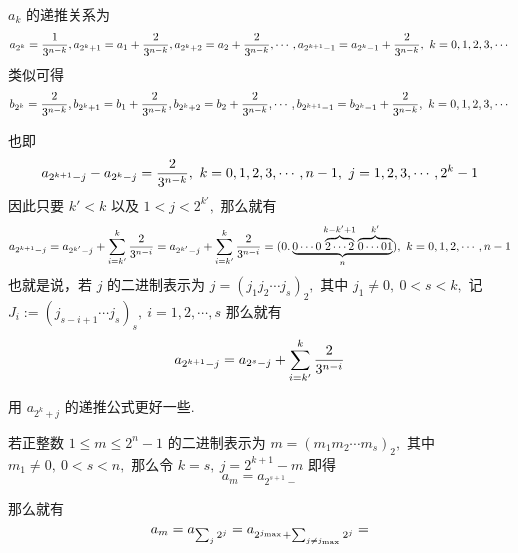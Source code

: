 \documentclass[12pt, a4paper, oneside]{book}
\numberwithin{figure}{section}
\theoremstyle{definition}
\begin{document}
$a_k$ 的递推关系为
\begin{equation}\label{a_k recurrence relation}
    a_{2^k}={1\over 3^{n-k}},a_{2^k+1}=a_1+{2\over 3^{n-k}}, a_{2^k+2}=a_{2}+{2\over 3^{n-k}},\cdots,a_{2^{k+1}-1}=a_{2^{k}-1}+{2\over 3^{n-k}},\ k=0,1,2,3,\cdots
\end{equation}
类似可得
\begin{equation}
    b_{2^k}={2\over 3^{n-k}},b_{2^k+1}=b_1+{2\over 3^{n-k}}, b_{2^k+2}=b_{2}+{2\over 3^{n-k}},\cdots,b_{2^{k+1}-1}=b_{2^{k}-1}+{2\over 3^{n-k}},\ k=0,1,2,3,\cdots
\end{equation}

也即
\begin{equation}
    a_{2^{k+1}-j}-a_{2^k-j}={2\over 3^{n-k}},\ k=0,1,2,3,\cdots,n-1,\ j=1,2,3,\cdots,2^{k}-1
\end{equation}
因此只要 $k'<k$ 以及 $1<j<2^{k'},$ 那么就有
\begin{equation}
    a_{2^{k+1}-j}=a_{2^{k'}-j}+\sum_{i=k'}^k {2\over 3^{n-i}}=a_{2^{k'}-j}+\sum_{i=k'}^k {2\over 3^{n-i}}=(0.\underbrace{{0\cdots 0\overbrace{2\cdots 2}^{k-k'+1}}\overbrace{0\cdots 01}^{k'} }_{n}),\ k=0,1,2,\cdots,n-1
\end{equation}
也就是说，若 $j$ 的二进制表示为 $j=(j_1j_2\cdots j_{s})_2,$ 其中 $j_1\neq 0,\ 0<s<k,$ 
记 $J_i:=(j_{s-i+1}\cdots j_s)_s,\ i=1,2,\cdots,s$ 那么就有
\begin{equation}
    a_{2^{k+1}-j}=a_{2^{s}-j}+\sum_{i=k'}^k {2\over 3^{n-i}}
\end{equation}

用 $a_{2^k+j}$ 的递推公式更好一些.



若正整数 $1\leq m\leq 2^n-1$ 的二进制表示为 $m=(m_1m_2\cdots m_{s})_2,$ 其中 $m_1\neq 0,\ 0<s<n,$ 那么令 $k=s,\ j=2^{k+1}-m$ 即得
\begin{equation}
    a_m=a_{2^{s+1}-}
\end{equation}

那么就有
\begin{equation}
    a_m = a_{\sum_{j} 2^j}=a_{2^{j_{\max}}+\sum_{j\neq j_{\rm max}} 2^j}=
\end{equation}
\end{document}
